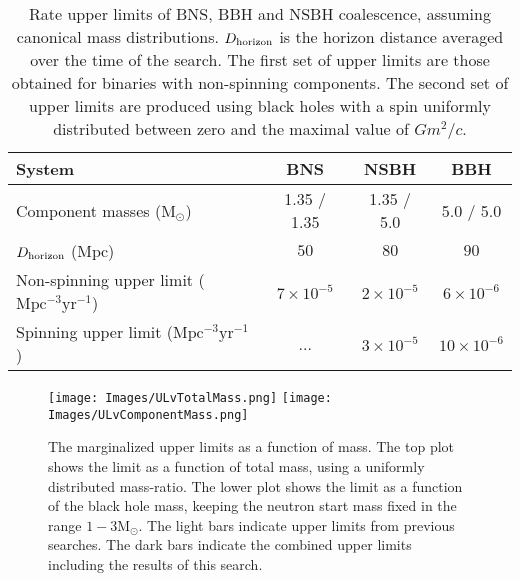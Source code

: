 \documentclass[prd,superscriptaddress,showpacs,amssymb,amsmath,amsfonts,aps,altaffilletter,nofootinbib,letterpaper,twocolumn]{revtex4}
\def\Msun{\ensuremath{\mathrm{M_{\odot}}}}
\def\BNShd{\ensuremath{50}}
\def\BNSul{\ensuremath{7 \times 10^{-5}}}
\def\NSBHhd{\ensuremath{80}}
\def\NSBHul{\ensuremath{2 \times 10^{-5}}}
\def\sNSBHul{\ensuremath{3 \times 10^{-5}}}
\def\BBHhd{\ensuremath{90}}
\def\BBHul{\ensuremath{6 \times 10^{-6}}}
\def\sBBHul{\ensuremath{10 \times 10^{-6}}}
\begin{document}
\begin{table}
\center
\begin{tabular}{p{4cm}  c  c  c}
\hline \hline
\raggedright{System}                                                    &   BNS       &    NSBH    &    BBH      \\[2pt]
\hline                                                                                             
\raggedright{Component masses ($\Msun$)}                                & 1.35 / 1.35 & 1.35 / 5.0 & 5.0 / 5.0   \\[2pt]
\raggedright{$D_{\rm horizon}$ ($\mathrm{Mpc}$)}                        &   \BNShd    &   \NSBHhd  &   \BBHhd    \\[2pt]
\raggedright{Non-spinning upper limit ($\mathrm{Mpc^{-3} yr^{-1}}$)}    &   \BNSul    &   \NSBHul  &   \BBHul    \\[2pt]
\raggedright{Spinning upper limit ($\mathrm{Mpc^{-3} yr^{-1}}$)}        &    ...      &   \sNSBHul &   \sBBHul   \\[2pt]
\hline
\hline
\end{tabular}
\caption{Rate upper limits of \ac{BNS}, \ac{BBH} and \ac{NSBH} coalescence,
assuming canonical mass distributions.  $D_{\rm horizon}$ is the horizon
distance averaged over the time of the search.  The first set of upper limits
are those obtained for binaries with non-spinning components.  The second set
of upper limits are produced using black holes with a spin uniformly
distributed between zero and the maximal value of $Gm^{2}/c$.}
\label{tab:ul}
\end{table}


\begin{figure}[htb]
\begin{center}
\texttt{[image: Images/ULvTotalMass.png]}
\texttt{[image: Images/ULvComponentMass.png]}
\caption{The marginalized upper limits as a function of mass. The top plot
shows the limit as a function of total mass, using a uniformly distributed
mass-ratio. The lower plot shows the limit as a function of the black hole
mass, keeping the neutron start mass fixed in the range $1-3\Msun$. The
light bars indicate upper limits from previous searches. The dark bars
indicate the combined upper limits including the results of this search.}
\label{fig:ULplots}
\end{center}
\end{figure}
\end{document}
